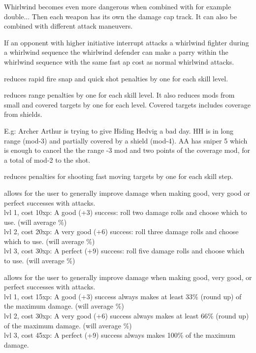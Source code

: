Whirlwind becomes even more dangerous when combined with for example double... Then each weapon has its own the damage cap track. It can also be combined with different attack maneuvers.

If an opponent with higher initiative interrupt attacks a whirlwind fighter during a whirlwind sequence the whirlwind defender can make a parry within the whirlwind sequence with the same fast ap cost as normal whirlwind attacks.


 reduces rapid fire snap and quick shot penalties by one for each skill level.


 reduces range penalties by one for each skill level. It also reduces mods from small and covered targets by one for each level. Covered targets includes coverage from shields.

E.g: Archer Arthur is trying to give Hiding Hedvig a bad day. HH is in long range (mod-3) and partially covered by a shield (mod-4). AA has sniper 5 which is enough to cancel the the range -3 mod and two points of the coverage mod, for a total of mod-2 to the shot.


 reduces penalties for shooting fast moving targets by one for each skill step.


 allows for the user to generally improve damage when making good, very good or perfect successes with attacks. \\
lvl 1, cost 10xp: A good (+3) success: roll two damage rolls and choose which to use. (will average \%) \\
lvl 2, cost 20xp: A very good (+6) success: roll three damage rolls and choose which to use. (will average \%) \\
lvl 3, cost 30xp: A perfect (+9) success: roll five damage rolls and choose which to use. (will average \%)


 allows for the user to generally improve damage when making good, very good, or perfect successes with attacks. \\
lvl 1, cost 15xp: A good (+3) success always makes at least 33\% (round up) of the maximum damage. (will average \%) \\
lvl 2, cost 30xp: A very good (+6) success always makes at least 66\% (round up) of the maximum damage. (will average \%) \\
lvl 3, cost 45xp: A perfect (+9) success always makes 100\% of the maximum damage.


